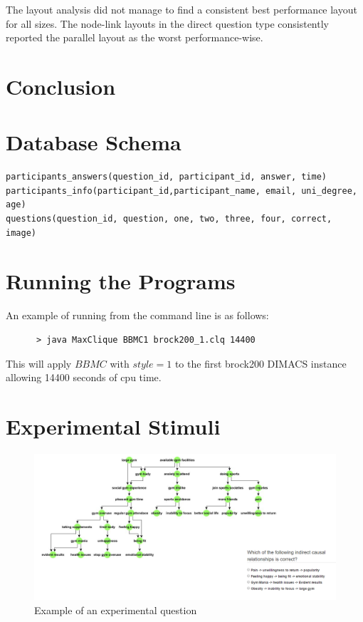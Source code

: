 \documentclass{l4proj}
\begin{document}
The layout analysis did not manage to find a consistent best performance layout for all sizes. The node-link layouts in the direct question type consistently reported the parallel layout as the worst performance-wise. 


\chapter{Conclusion}


\begin{appendices}

\chapter{Database Schema}

\begin{verbatim}
participants_answers(question_id, participant_id, answer, time)
participants_info(participant_id,participant_name, email, uni_degree, age)
questions(question_id, question, one, two, three, four, correct, image)
\end{verbatim}


\chapter{Running the Programs}
An example of running from the command line is as follows:
\begin{verbatim}
      > java MaxClique BBMC1 brock200_1.clq 14400
\end{verbatim}
This will apply $BBMC$ with $style = 1$ to the first brock200 DIMACS instance allowing 14400 seconds of cpu time.


\chapter{Experimental Stimuli}


\begin{figure}
\centering
\includegraphics[width=24cm]{exampleQuestion.PNG}
\caption{Example of an experimental question}
\label{exampleQuestion}
\end{figure}



\end{appendices}
\end{document}
